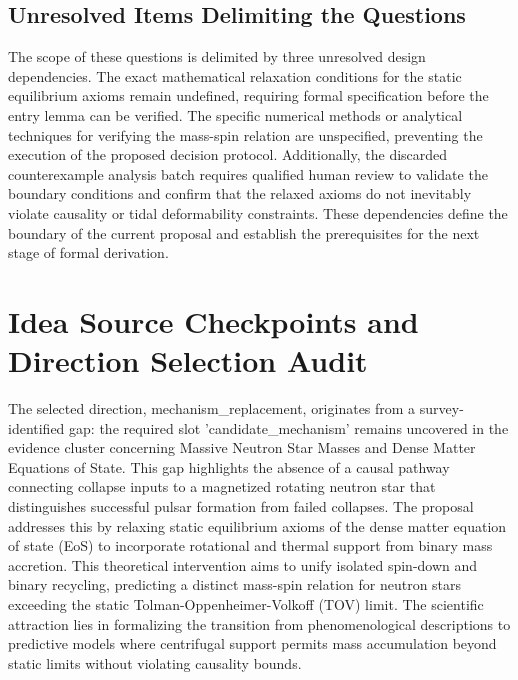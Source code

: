 \documentclass[conference]{IEEEtran}
\begin{document}
\subsection{Unresolved Items Delimiting the Questions}
The scope of these questions is delimited by three unresolved design dependencies. The exact mathematical relaxation conditions for the static equilibrium axioms remain undefined, requiring formal specification before the entry lemma can be verified. The specific numerical methods or analytical techniques for verifying the mass-spin relation are unspecified, preventing the execution of the proposed decision protocol. Additionally, the discarded counterexample analysis batch requires qualified human review to validate the boundary conditions and confirm that the relaxed axioms do not inevitably violate causality or tidal deformability constraints. These dependencies define the boundary of the current proposal and establish the prerequisites for the next stage of formal derivation.~\cite{cite_42e341ff6471ce89,cite_a50fdc75b0400b49}

\section{Idea Source Checkpoints and Direction Selection Audit}
The selected direction, mechanism\_replacement, originates from a survey-identified gap: the required slot 'candidate\_mechanism' remains uncovered in the evidence cluster concerning Massive Neutron Star Masses and Dense Matter Equations of State. This gap highlights the absence of a causal pathway connecting collapse inputs to a magnetized rotating neutron star that distinguishes successful pulsar formation from failed collapses. The proposal addresses this by relaxing static equilibrium axioms of the dense matter equation of state (EoS) to incorporate rotational and thermal support from binary mass accretion. This theoretical intervention aims to unify isolated spin-down and binary recycling, predicting a distinct mass-spin relation for neutron stars exceeding the static Tolman-Oppenheimer-Volkoff (TOV) limit. The scientific attraction lies in formalizing the transition from phenomenological descriptions to predictive models where centrifugal support permits mass accumulation beyond static limits without violating causality bounds.
\end{document}
